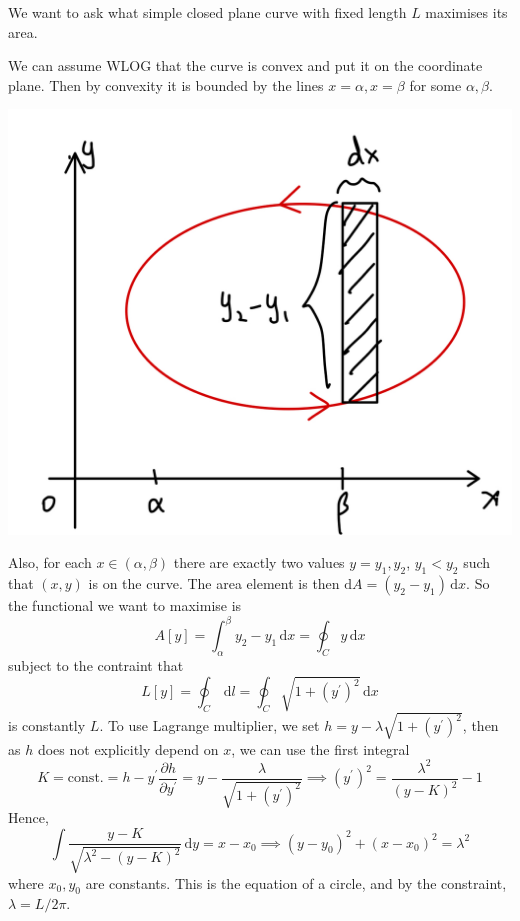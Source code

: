 \documentclass{article}
\begin{document}
\begin{example}
    We want to ask what simple closed plane curve with fixed length $L$ maximises its area.

    We can assume WLOG that the curve is convex and put it on the coordinate plane.
    Then by convexity it is bounded by the lines $x=\alpha,x=\beta$ for some $\alpha,\beta$.

    \begin{center}
        \includegraphics[scale=0.12]{isoparam.jpeg}
    \end{center}

    Also, for each $x\in(\alpha,\beta)$ there are exactly two values $y=y_1,y_2$, $y_1<y_2$ such that $(x,y)$ is on the curve.
    The area element is then $\mathrm dA=(y_2-y_1)\,\mathrm dx$.
    So the functional we want to maximise is
    $$A[y]=\int_\alpha^\beta y_2-y_1\,\mathrm dx=\oint_Cy\,\mathrm dx$$
    subject to the contraint that
    $$L[y]=\oint_C\,\mathrm dl=\oint_C\sqrt{1+(y^\prime)^2}\,\mathrm dx$$
    is constantly $L$.
    To use Lagrange multiplier, we set $h=y-\lambda\sqrt{1+(y^\prime)^2}$, then as $h$ does not explicitly depend on $x$, we can use the first integral
    $$K=\text{const.}=h-y^\prime\frac{\partial h}{\partial y^\prime}=y-\frac{\lambda}{\sqrt{1+(y^\prime)^2}}\implies (y^\prime)^2=\frac{\lambda^2}{(y-K)^2}-1$$
    Hence,
    $$\int\frac{y-K}{\sqrt{\lambda^2-(y-K)^2}}\,\mathrm dy=x-x_0\implies (y-y_0)^2+(x-x_0)^2=\lambda^2$$
    where $x_0,y_0$ are constants.
    This is the equation of a circle, and by the constraint, $\lambda=L/2\pi$.
\end{example}
\end{document}

